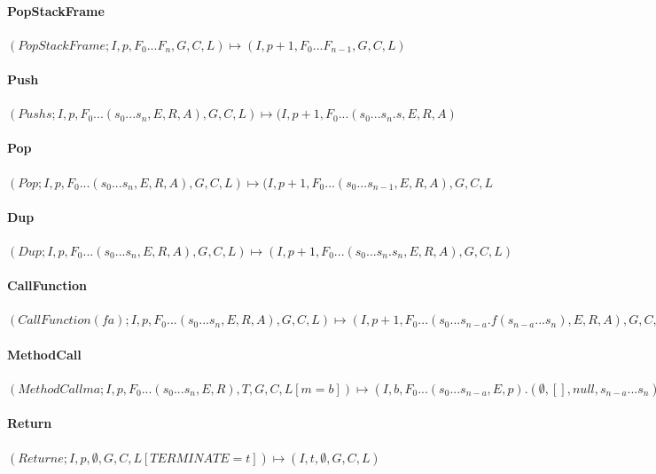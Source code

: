 \paragraph{PopStackFrame}

$(PopStackFrame; I, p, F_0...F_n, G, C, L) \mapsto (I, p+1, F_0...F_{n-1}, G, C, L)$

\paragraph{Push}

$(Push s; I, p, F_0...(s_0...s_n, E, R, A), G, C, L) \mapsto (I, p+1, F_0...(s_0...s_n.s, E, R, A)$

\paragraph{Pop}

$(Pop; I, p, F_0...(s_0...s_n, E, R, A), G, C, L) \mapsto (I, p+1, F_0...(s_0...s_{n-1}, E, R,  A), G, C, L$

\paragraph{Dup}

$(Dup; I, p, F_0...(s_0...s_n, E, R, A), G, C, L) \mapsto (I, p+1, F_0...(s_0...s_n.s_n, E, R, A), G, C, L)$

\paragraph{CallFunction}

$(CallFunction (f a); I, p, F_0...(s_0...s_n, E, R, A), G, C, L) \mapsto (I, p+1, F_0...(s_0...s_{n-a}.f(s_{n-a}...s_n), E, R, A), G, C, L)$

\paragraph{MethodCall}

$(MethodCall m a; I, p, F_0...(s_0...s_n, E, R), T, G, C, L[m=b]) \mapsto (I, b, F_0...(s_0...s_{n-a}, E, p).(\emptyset, [], null, s_{n-a}...s_n), G, C, L)$

\paragraph{Return}

$(Return e; I, p, \emptyset, G, C, L[TERMINATE=t]) \mapsto (I, t, \emptyset, G, C, L)$

